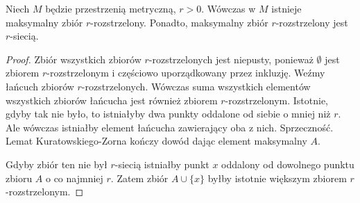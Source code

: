 \begin{lem} \label{lem:anti-net}
  Niech $M$ będzie przestrzenią metryczną, $r > 0$. Wówczas w $M$ istnieje maksymalny zbiór $r$-rozstrzelony. Ponadto, maksymalny zbiór $r$-rozstrzelony jest $r$-siecią.
  \begin{proof}
    Zbiór wszystkich zbiorów $r$-rozstrzelonych jest niepusty, ponieważ $\emptyset$ jest zbiorem $r$-rozstrzelonym i częściowo uporządkowany przez inkluzję. Weźmy łańcuch zbiorów $r$-rozstrzelonych. Wówczas suma wszystkich elementów wszystkich zbiorów łańcucha jest również zbiorem $r$-rozstrzelonym. Istotnie, gdyby tak nie było, to istniałyby dwa punkty oddalone od siebie o mniej niż $r$. Ale wówczas istniałby element łańcucha zawierający oba z nich. Sprzeczność. Lemat Kuratowskiego-Zorna kończy dowód dając element maksymalny $A$.
    
    Gdyby zbiór ten nie był $r$-siecią istniałby punkt $x$ oddalony od dowolnego punktu zbioru $A$ o co najmniej $r$. Zatem zbiór $A \cup \{x\}$ byłby istotnie większym zbiorem $r$-rozstrzelonym.
  \end{proof}
\end{lem}

